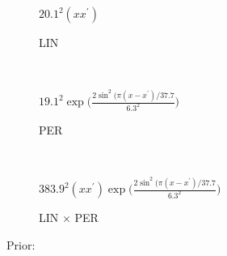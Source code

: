      \begin{subfigure}[b]{0.3\textwidth}
      \centering \footnotesize
       $20.1^2(x x^\prime) $ \vspace{2mm}
	\caption{LIN}
    \end{subfigure}
    ~ %
    \begin{subfigure}[b]{0.3\textwidth}
      \centering \footnotesize
      $19.1^2 \exp \bigg( \frac{2 \sin^2 ( \pi (x - x^\prime)/37.7}{6.3^2} \bigg)$ 
	\caption{PER}
    \end{subfigure}
    ~ %
    \begin{subfigure}[b]{0.3\textwidth}
    \centering \footnotesize
      $383.9^2 (x x^\prime) \exp \bigg( \frac{2 \sin^2 ( \pi (x - x^\prime)/37.7}{6.3^2} \bigg)$ 
        \caption{LIN $\times$ PER}
    \end{subfigure} \vspace{4mm} 

Prior:

